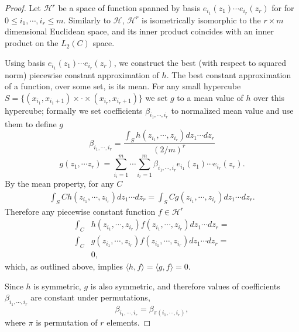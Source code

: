 \documentclass{article}
\begin{document}
\begin{proof}
Let $\mathcal H^r$ be a space of function spanned by basis $e_{i_1}(z_1) \cdots  e_{i_r}(z_r)$ for for $0\leq i_1,\cdots,i_r\leq m$. Similarly to $\mathcal{H}$, $\mathcal H^r$ is  isometrically isomorphic to  the $r \times m$ dimensional Euclidean space, and its inner product coincides with an inner product on the $L_2(C)$ space. 

Using basis $e_{i_1}(z_1) \cdots  e_{i_r}(z_r)$,  we construct the best (with respect to squared norm) piecewise  constant  approximation of $h$.  The best constant approximation of a function, over some set, is its mean. For any small hypercube $S =  \{ (x_{i_1},x_{i_1+1}) \times \cdot \times (x_{i_r},x_{i_r+1})\}$ we set $g$ to a mean value of $h$ over this hypercube; formally we set coefficients $\beta_{i_1,\cdots,i_r}$ to normalized mean value and use them to define $g$
\[
\beta_{i_1,\cdots,i_r} = \frac{ \int_{S} h(z_{i_1},\cdots,z_{i_r} ) dz_1 \cdots dz_r} { (2/m)^r} 
\]
\[
 g(z_1,\cdots z_r)= \sum_{i_i=1}^m \cdots \sum_{i_r=1}^m \beta_{i_1,\cdots,i_r} e_{i_1}(z_1) \cdots  e_{i_r}(z_r).
\]
By the mean property, for any $C$
\begin{align}
\int_{S} C h(z_{i_1},\cdots,z_{i_r} ) dz_1 \cdots dz_r= \int_{S} C g(z_{i_1},\cdots,z_{i_r} ) dz_1 \cdots dz_r.
\end{align}
Therefore any piecewise constant function $f \in \mathcal{H}^r$ 
\begin{align}
\int_{C}& h(z_{i_1},\cdots,z_{i_r}) f(z_{i_1},\cdots,z_{i_r}) dz_1 \cdots dz_r = \\
\int_{C}& g(z_{i_1},\cdots,z_{i_r}) f(z_{i_1},\cdots,z_{i_r})dz_1 \cdots dz_r=\\
&0, 
\end{align}
which, as outlined above, implies $\langle h,f \rangle = \langle g,f \rangle =0$. 


Since $h$ is symmetric, $g$ is also symmetric, and therefore values of coefficients $\beta_{i_1,\cdots,i_r}$ are constant under permutations,  
\[
 \beta_{i_1,\cdots,i_r} = \beta_{\pi(i_1,\cdots,i_r)},
\]
where $\pi$ is permutation of $r$ elements. 


\end{proof}
\end{document}
